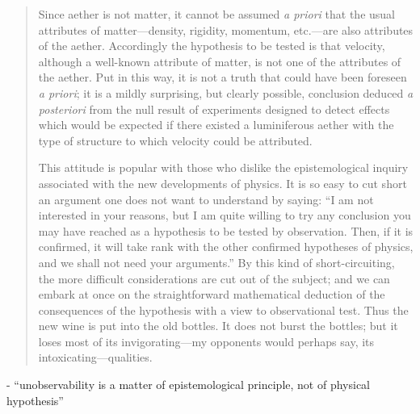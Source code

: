 \begin{quote}
    Since aether is not matter, it cannot be assumed \emph{a priori} that the usual attributes of matter---density, rigidity, momentum, etc.---are also attributes of the aether.  Accordingly the hypothesis to be tested is that velocity, although a well-known attribute of matter, is not one of the attributes of the aether.  Put in this way, it is not a truth that could have been foreseen \emph{a priori}; it is a mildly surprising, but clearly possible, conclusion deduced \emph{a posteriori} from the null result of experiments designed to detect effects which would be expected if there existed a luminiferous aether with the type of structure to which velocity could be attributed.
    
    This attitude is popular with those who dislike the epistemological inquiry associated with the new developments of physics.  It is so easy to cut short an argument one does not want to understand by saying: ``I am not interested in your reasons, but I am quite willing to try any conclusion you may have reached as a hypothesis to be tested by observation.  Then, if it is confirmed, it will take rank with the other confirmed hypotheses of physics, and we shall not need your arguments.''  By this kind of short-circuiting, the more difficult considerations are cut out of the subject; and we can embark at once on the straightforward mathematical deduction of the consequences of the hypothesis with a view to observational test.  Thus the new wine is put into the old bottles.  It does not burst the bottles; but it loses most of its invigorating---my opponents would perhaps say, its intoxicating---qualities.  
    
    \citep[p. 34-35]{Eddington1939}
\end{quote}

- ``unobservability is a matter of epistemological principle, not of physical hypothesis''

